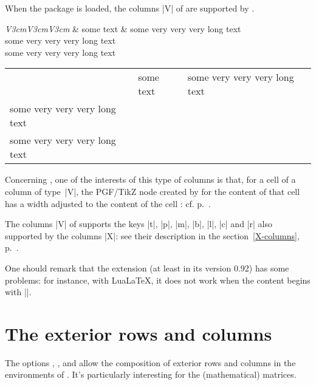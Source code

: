 \documentclass[dvipsnames]{article}%
\begin{document}
\smallskip
When the package  is loaded, the columns |V| of 
are supported by . 

\medskip
\begin{Code}
\begin{NiceTabular}[corners=NW,hvlines]{\emph{V{3cm}V{3cm}V{3cm}}}
& some text & some very very very long text \\
some very very very long text \\
some very very very long text 
\end{NiceTabular}
\end{Code}

\medskip
\begin{center}
\begin{NiceTabular}[corners=NW,hvlines]{V{3cm}V{3cm}V{3cm}}
& some text & some very very very long text \\
some very very very long text \\
some very very very long text 
\end{NiceTabular}
\end{center}

\bigskip
Concerning , one of the
interests of this type of columns is that, for a cell of a column of type~|V|,
the PGF/TikZ node created by  for the content of that cell has
a width adjusted to the content of the cell : cf. p.~\pageref{node-V}. 


\bigskip
The columns |V| of  supports the keys |t|, |p|, |m|, |b|, |l|,
|c| and |r| also supported by the columns |X|: see their description in the
section~\ref{X-columns}, p.~\pageref{X-columns}.

\bigskip
One should remark that the extension  (at least in its version
0.92) has some problems: for instance, with LuaLaTeX, it does not work when
the content begins with |\color|.



\bigskip
\section{The exterior rows and columns}


The options , ,
 and  allow the composition of
exterior rows and columns in the environments of . It's
particularly interesting for the (mathematical) matrices.
\label{exterior}
\end{document}
